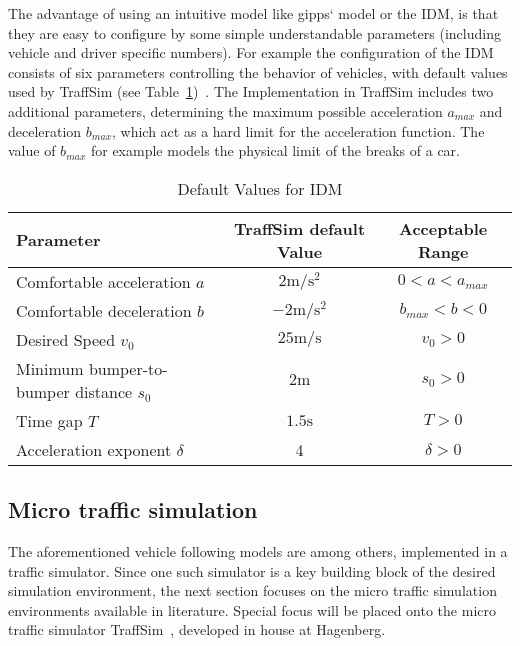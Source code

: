             The advantage of using an intuitive model like gipps` model or the IDM, is that they are easy to configure by some simple understandable parameters (including vehicle and driver specific numbers).
            For example the configuration of the IDM consists of six parameters controlling the behavior of vehicles, with default values used by TraffSim (see Table~\ref{tab:IDM-Default-Values})~\cite{treiber2013traffic,backfrieder2013traffsim,backfrieder2014traffsim}.
            The Implementation in TraffSim includes two additional parameters, determining the maximum possible acceleration $a_{max}$ and deceleration $b_{max}$, which act as a hard limit for the acceleration function.
            The value of $b_{max}$ for example models the physical limit of the breaks of a car.
            \begin{table}
                \centering
                \begin{tabular}{l c c}
                    Parameter & TraffSim default Value & Acceptable Range \\
                    \hline
                    Comfortable acceleration $a$ & $2 \si{\m\per\s\squared}$ & $ 0 < a < a_{max}$\\
                    Comfortable deceleration $b$ & $-2 \si{\m\per\s\squared}$ & $ b_{max} < b < 0$\\
                    Desired Speed $v_0$ & $25 \si{\m\per\s}$ & $v_0 > 0$ \\
                    Minimum bumper-to-bumper distance $s_0$ & $2 \si{\m}$ & $s_0 > 0$ \\
                    Time gap $T$ & $1.5 \si{\s}$ & $T > 0$\\
                    Acceleration exponent $\delta$ \footnotemark& 4 & $\delta >  0$\\
                \end{tabular}
                \caption{Default Values for IDM}
                \label{tab:IDM-Default-Values}
            \end{table}

        \subsection{Micro traffic simulation}\label{subsec:micro-traffic-simulation}
            The aforementioned vehicle following models are among others, implemented in a traffic simulator.
            Since one such simulator is a key building block of the desired simulation environment, the next section focuses on the micro traffic simulation environments available in literature.
            Special focus will be placed onto the micro traffic simulator TraffSim~\cite{backfrieder2013traffsim,backfrieder2014traffsim}, developed in house at Hagenberg.

